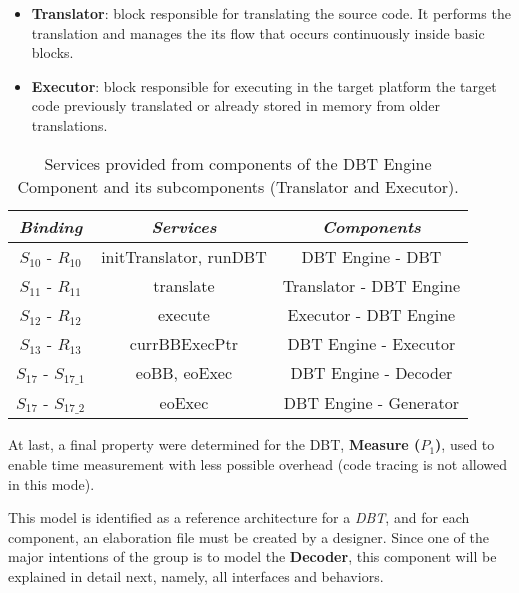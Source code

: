 \begin{itemize}
\begin{itemize}
\item \textbf{Translator}: block responsible for translating the source code. It performs the translation and manages the its flow that occurs continuously inside basic blocks. 
\item \textbf{Executor}: block responsible for executing in the target platform the target code previously translated or already stored in memory from older translations. 
\end{itemize}
\end{itemize}

\begin{table}[!htb]
\centering
\caption{Services provided from components of the DBT Engine Component and its subcomponents (Translator and Executor).}
\label{tab:dbtenginetable}
\begin{tabular}{|c|c|c|}
\hline
\textit{\textbf{Binding}}  & \textit{\textbf{Services}}    &  \textit{\textbf{Components}}    \\ \hline
$S_{10}$ - $R_{10}$   &  initTranslator, runDBT  & DBT Engine - DBT  \\ \hline
$S_{11}$ - $R_{11}$  & translate   & Translator - DBT Engine \\ \hline
$S_{12}$ - $R_{12}$  & execute   & Executor - DBT Engine \\ \hline
$S_{13}$ - $R_{13}$  & currBBExecPtr & DBT Engine - Executor
\\ \hline
$S_{17}$ - $S_{17\_1}$  & eoBB, eoExec & DBT Engine -  Decoder  \\ \hline
$S_{17}$ - $S_{17\_2}$  & eoExec & DBT Engine - Generator \\ \hline
\end{tabular}
\end{table}

At last, a final property were determined for the DBT, \textbf{Measure ($P_1$)}, used to enable time measurement with less possible overhead (code tracing is not allowed in this mode).


This model is identified as a reference architecture for a \textit{DBT}, and for each component, an elaboration file must be created by a designer. Since one of the major intentions of the group is to model the \textbf{Decoder}, this component will be explained in detail next, namely, all interfaces and behaviors.  


